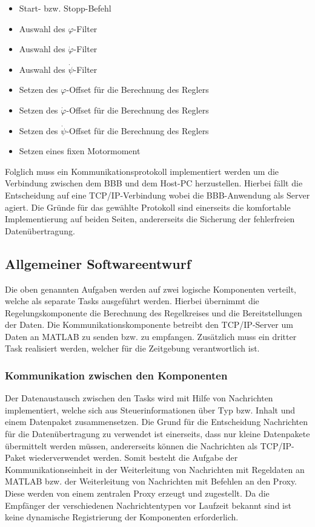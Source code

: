 \documentclass{article}
\begin{document}
\begin{itemize}
\setlength\itemsep{0em}
\item Start- bzw. Stopp-Befehl
\item Auswahl des $\varphi$-Filter
\item Auswahl des $\dot{\varphi}$-Filter
\item Auswahl des $\dot{\psi}$-Filter
\item Setzen des $\varphi$-Offset für die Berechnung des Reglers
\item Setzen des $\dot{\varphi}$-Offset für die Berechnung des Reglers
\item Setzen des $\dot{\psi}$-Offset für die Berechnung des Reglers
\item Setzen eines fixen Motormoment
\end{itemize}
Folglich muss ein Kommunikationsprotokoll implementiert werden um die Verbindung zwischen dem BBB und dem Host-PC herzustellen. Hierbei fällt die Entscheidung auf eine TCP/IP-Verbindung wobei die BBB-Anwendung als Server agiert. Die Gründe für das gewählte Protokoll sind einerseits die komfortable Implementierung auf beiden Seiten, andererseits die Sicherung der fehlerfreien Datenübertragung.

\subsection{Allgemeiner Softwareentwurf}
Die oben genannten Aufgaben werden auf zwei logische Komponenten verteilt, welche als separate Tasks ausgeführt werden. Hierbei übernimmt die Regelungskomponente die Berechnung des Regelkreises und die Bereitstellungen der Daten. Die Kommunikationskomponente betreibt den TCP/IP-Server um Daten an MATLAB zu senden bzw. zu empfangen. Zusätzlich muss ein dritter Task realisiert werden, welcher für die Zeitgebung verantwortlich ist. 

\subsubsection{Kommunikation zwischen den Komponenten}
Der Datenaustausch zwischen den Tasks wird mit Hilfe von Nachrichten implementiert, welche sich aus Steuerinformationen über Typ bzw. Inhalt und einem Datenpaket zusammensetzen. Die Grund für die Entscheidung Nachrichten für die Datenübertragung zu verwendet ist einerseits, dass nur kleine Datenpakete übermittelt werden müssen, andererseits können die Nachrichten als TCP/IP-Paket wiederverwendet werden. Somit besteht die Aufgabe der Kommunikationseinheit in der Weiterleitung von Nachrichten mit Regeldaten an MATLAB bzw. der Weiterleitung von Nachrichten mit Befehlen an den Proxy. Diese werden von einem zentralen Proxy erzeugt und zugestellt. Da die Empfänger der verschiedenen Nachrichtentypen vor Laufzeit bekannt sind ist keine dynamische Registrierung der Komponenten erforderlich.
\end{document}
